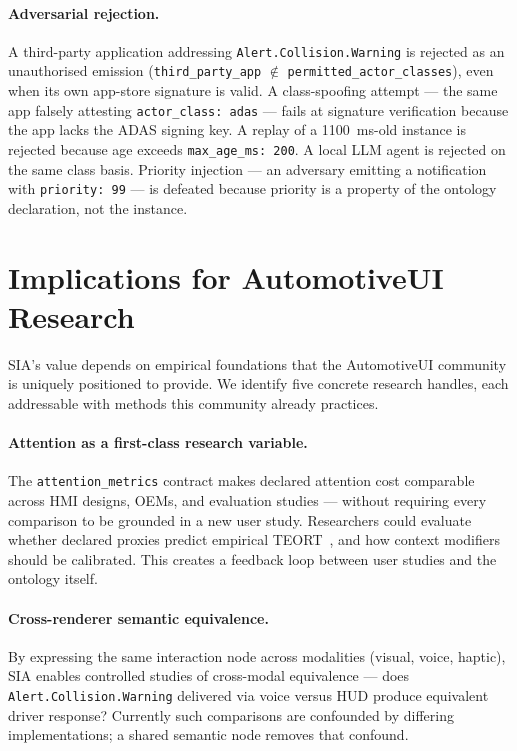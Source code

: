\documentclass[manuscript,screen,review,anonymous]{acmart}
\begin{document}
\paragraph{Adversarial rejection.}
A third-party application addressing \texttt{Alert.Collision.Warning} is
rejected as an unauthorised emission
(\texttt{third\_party\_app} $\notin$ \texttt{permitted\_actor\_classes}), even
when its own app-store signature is valid. A class-spoofing attempt --- the
same app falsely attesting \texttt{actor\_class: adas} --- fails at signature
verification because the app lacks the ADAS signing key. A replay of a
1100~ms-old instance is rejected because age exceeds
\texttt{max\_age\_ms: 200}. A local LLM agent is rejected on the same class
basis. Priority injection --- an adversary emitting a notification with
\texttt{priority: 99} --- is defeated because priority is a property of the
ontology declaration, not the instance.

\section{Implications for AutomotiveUI Research}

SIA's value depends on empirical foundations that the AutomotiveUI community
is uniquely positioned to provide. We identify five concrete research handles,
each addressable with methods this community already practices.

\paragraph{Attention as a first-class research variable.}
The \texttt{attention\_metrics} contract makes declared attention cost
comparable across HMI designs, OEMs, and evaluation studies --- without
requiring every comparison to be grounded in a new user study. Researchers
could evaluate whether declared proxies predict empirical TEORT~\cite{ebel2021},
and how context modifiers should be calibrated. This creates a feedback loop
between user studies and the ontology itself.

\paragraph{Cross-renderer semantic equivalence.}
By expressing the same interaction node across modalities (visual, voice,
haptic), SIA enables controlled studies of cross-modal equivalence --- does
\texttt{Alert.Collision.Warning} delivered via voice versus HUD produce
equivalent driver response? Currently such comparisons are confounded by
differing implementations; a shared semantic node removes that confound.
\end{document}
